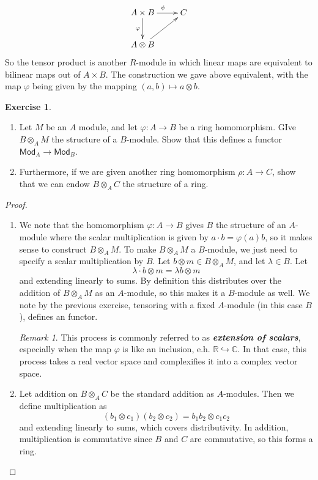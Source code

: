 \documentclass[psamsfonts]{amsart}
\theoremstyle{definition}
\newtheorem{exer}[thm]{Exercise}
\theoremstyle{remark}
\newtheorem*{rem*}{Remark}
\newcommand{\R}{\mathbb{R}}
\newcommand{\ib}[1]{\textbf{\textit{#1}}}
\newcommand{\C}{\mathbb{C}}
\newcommand{\enumbreak}{\ \\ \vspace{-\baselineskip}}
\begin{document}
$$\xymatrix{
A\times B \ar[r]^\psi \ar[d]_{\varphi} & C \\
A \otimes B \ar[ur]
}$$  
So the tensor product is another $R$-module in which linear maps are equivalent to bilinear maps out of $A \times B$. The construction we gave above equivalent, with the map $\varphi$ being given by the mapping $(a,b) \mapsto a \otimes b$.
%
\begin{exer}\enumbreak
\begin{enumerate}
\item Let $M$ be an $A$ module, and let $\varphi : A \to B$ be a ring homomorphism. GIve $B \otimes_A M$ the structure of a $B$-module. Show that this defines a functor $\mathsf{Mod}_A \to \mathsf{Mod}_B$.
\item Furthermore, if we are given another ring homomorphism $\rho : A \to C$, show that we can endow $B \otimes_A C$ the structure of a ring.
\end{enumerate}
\end{exer}
%
\begin{proof}\enumbreak
\begin{enumerate}
\item We note that the homomorphism $\varphi: A \to B$ gives $B$ the structure of an $A$-module where the scalar multiplication is given by $a \cdot b = \varphi(a)b$, so it makes sense to construct $B \otimes_A M$. To make $B \otimes_A M$ a $B$-module, we just need to specify a scalar multiplication by $B$. Let $b \otimes m \in B \otimes_A M$, and let $\lambda \in B$. Let 
$$\lambda \cdot b \otimes m = \lambda b \otimes m$$
and extending linearly to sums. By definition this distributes over the addition of $B \otimes_A M$ as an $A$-module, so this makes it a $B$-module as well. We note by the previous exercise, tensoring with a fixed $A$-module (in this case $B$), defines an functor.
\begin{rem*}
This process is commonly referred to as \ib{extension of scalars}, especially when the map $\varphi$ is like an inclusion, e.h. $\R \hookrightarrow \C$. In that case, this process takes a real vector space and complexifies it into a complex vector space.
\end{rem*}
\item Let addition on $B \otimes_A C$ be the standard addition as $A$-modules. Then we define multiplication as 
$$(b_1\otimes c_1)(b_2 \otimes c_2) = b_1b_2 \otimes  c_1c_2$$
and extending linearly to sums, which covers distributivity. In addition, multiplication is commutative since $B$ and $C$ are commutative, so this forms a ring.
\end{enumerate}
\end{proof}
\end{document}
